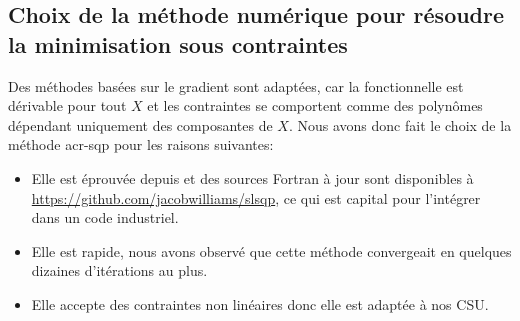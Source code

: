 \subsection{Choix de la méthode numérique pour résoudre la minimisation sous contraintes}

  Des méthodes basées sur le gradient sont adaptées, car la fonctionnelle est dérivable pour tout \(X\) et les contraintes se comportent comme des polynômes dépendant uniquement des composantes de \(X\). Nous avons donc fait le choix de la méthode \gls{acr-sqp} pour les raisons suivantes:
 
  \begin{itemize}
    \item Elle est éprouvée depuis \cite{kraft_software_1988} et des sources Fortran à jour sont disponibles à \url{https://github.com/jacobwilliams/slsqp}, ce qui est capital pour l'intégrer dans un code industriel.
    \item Elle est rapide, nous avons observé que cette méthode convergeait en quelques dizaines d'itérations au plus.
    \item Elle accepte des contraintes non linéaires donc elle est adaptée à nos CSU.
  \end{itemize}


